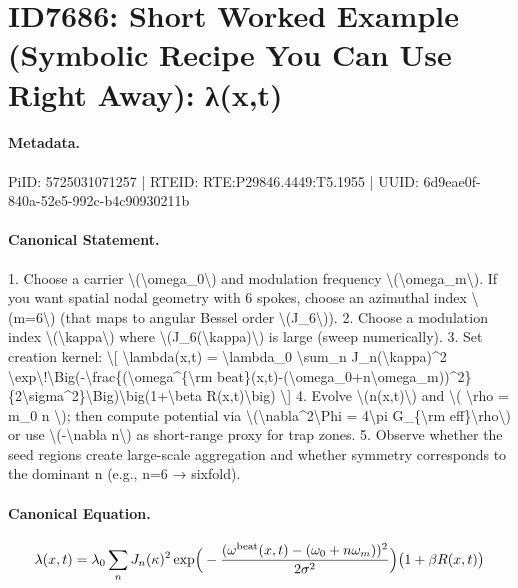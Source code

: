 \section*{ID7686: Short Worked Example (Symbolic Recipe You Can Use Right Away): λ(x,t)}
\paragraph{Metadata.}
PiID: 5725031071257 | RTEID: RTE:P29846.4449:T5.1955 | UUID: 6d9eae0f-840a-52e5-992c-b4c90930211b

\paragraph{Canonical Statement.}
1. Choose a carrier \textbackslash{}(\textbackslash{}omega\_0\textbackslash{}) and modulation frequency \textbackslash{}(\textbackslash{}omega\_m\textbackslash{}). If you want spatial nodal geometry with 6 spokes, choose an azimuthal index \textbackslash{}(m=6\textbackslash{}) (that maps to angular Bessel order \textbackslash{}(J\_6\textbackslash{})). 2. Choose a modulation index \textbackslash{}(\textbackslash{}kappa\textbackslash{}) where \textbackslash{}(J\_6(\textbackslash{}kappa)\textbackslash{}) is large (sweep numerically). 3. Set creation kernel: \textbackslash{}[ \textbackslash{}lambda(x,t) = \textbackslash{}lambda\_0 \textbackslash{}sum\_n J\_n(\textbackslash{}kappa)\textasciicircum{}2 \textbackslash{}exp\textbackslash{}!\textbackslash{}Big(-\textbackslash{}frac\{(\textbackslash{}omega\textasciicircum{}\{\textbackslash{}rm beat\}(x,t)-(\textbackslash{}omega\_0+n\textbackslash{}omega\_m))\textasciicircum{}2\}\{2\textbackslash{}sigma\textasciicircum{}2\}\textbackslash{}Big)\textbackslash{}big(1+\textbackslash{}beta R(x,t)\textbackslash{}big) \textbackslash{}] 4. Evolve \textbackslash{}(n(x,t)\textbackslash{}) and \textbackslash{}( \textbackslash{}rho = m\_0 n \textbackslash{}); then compute potential via \textbackslash{}(\textbackslash{}nabla\textasciicircum{}2\textbackslash{}Phi = 4\textbackslash{}pi G\_\{\textbackslash{}rm eff\}\textbackslash{}rho\textbackslash{}) or use \textbackslash{}(-\textbackslash{}nabla n\textbackslash{}) as short-range proxy for trap zones. 5. Observe whether the seed regions create large-scale aggregation and whether symmetry corresponds to the dominant n (e.g., n=6 → sixfold).

\paragraph{Canonical Equation.}
\[
\lambda(x,t) = \lambda_0 \sum_n J_n(\kappa)^2 \exp\!\Big(-\frac{(\omega^{\rm beat}(x,t)-(\omega_0+n\omega_m))^2}{2\sigma^2}\Big)\big(1+\beta R(x,t)\big)
\]

